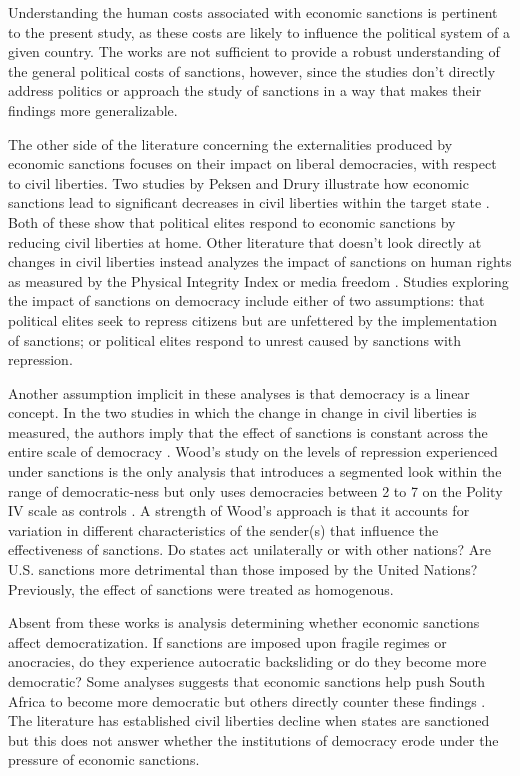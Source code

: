 \documentclass[a4paper]{article}\usepackage[]{graphicx}\usepackage[]{color}
\begin{document}
\par
Understanding the human costs associated with economic sanctions is pertinent to the present study, as these costs are likely to influence the political system of a given country. The works are not sufficient to provide a robust understanding of the general political costs of sanctions, however, since the studies don't directly address politics or approach the study of sanctions in a way that makes their findings more generalizable.  
\par
The other side of the literature concerning the externalities produced by economic sanctions focuses on their impact on liberal democracies, with respect to civil liberties. Two studies by Peksen and Drury illustrate how economic sanctions lead to significant decreases in civil liberties within the target state \citep{peksen2009economic, peksen2010coercive}. Both of these show that political elites respond to economic sanctions by reducing civil liberties at home. Other literature that doesn't look directly at changes in civil liberties instead analyzes the impact of sanctions on human rights as measured by the Physical Integrity Index \citep{cingranelli2010cingranelli, peksen2009better, wood2008hand} or media freedom \citep{pdeksen2010coercive}. Studies exploring the impact of sanctions on democracy include either of two assumptions: that political elites seek to repress citizens but are unfettered by the implementation of sanctions; or political elites respond to unrest caused by sanctions with repression.
\par
Another assumption implicit in these analyses is that democracy is a linear concept. In the two studies in which the change in change in civil liberties is measured, the authors imply that the effect of sanctions is constant across the entire scale of democracy \citep{peksen2009economic, peksen2010coercive}. Wood's study on the levels of repression experienced under sanctions is the only analysis that introduces a segmented look within the range of democratic-ness but only uses democracies between 2 to 7 on the Polity IV scale as controls \citep{wood2008hand}. A strength of Wood's approach is that it accounts for variation in different characteristics of the sender(s) that influence the effectiveness of sanctions. Do states act unilaterally or with other nations? Are U.S. sanctions more detrimental than those imposed by the United Nations? Previously, the effect of sanctions were treated as homogenous.  
\par
Absent from these works is analysis determining whether economic sanctions affect democratization. If sanctions are imposed upon fragile regimes or anocracies, do they experience autocratic backsliding or do they become more democratic? Some analyses suggests that economic sanctions help push South Africa to become more democratic \citep{klotz1995norms} but others directly counter these findings \citep{levy1999sanctions}. The literature has established civil liberties decline when states are sanctioned but this does not answer whether the institutions of democracy erode under the pressure of economic sanctions.  
\end{document}
